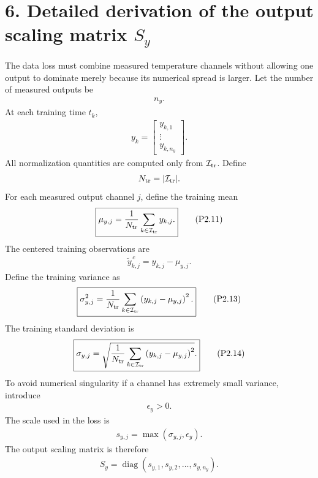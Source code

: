 \documentclass[11pt]{article}
\begin{document}
\section*{6. Detailed derivation of the output scaling matrix \(S_y\)}
The data loss must combine measured temperature channels without allowing one output to dominate merely because its numerical spread is larger. Let the number of measured outputs be
\begin{align}
n_y.
\end{align}
At each training time \(t_k\),
\begin{align}
y_k=\begin{bmatrix}y_{k,1}\\ \vdots\\ y_{k,n_y}\end{bmatrix}.
\end{align}
All normalization quantities are computed only from \(\mathcal I_{\rm tr}\). Define
\begin{align}
N_{\rm tr}=|\mathcal I_{\rm tr}|.
\end{align}
For each measured output channel \(j\), define the training mean
\begin{align}
\boxed{\mu_{y,j}=\frac{1}{N_{\rm tr}}\sum_{k\in\mathcal I_{\rm tr}}y_{k,j}.}
\tag{P2.11}
\end{align}
The centered training observations are
\begin{align}
\widetilde y^{\,c}_{k,j}=y_{k,j}-\mu_{y,j}.
\tag{P2.12}
\end{align}
Define the training variance as
\begin{align}
\boxed{\sigma_{y,j}^2=\frac{1}{N_{\rm tr}}\sum_{k\in\mathcal I_{\rm tr}}\left(y_{k,j}-\mu_{y,j}\right)^2.}
\tag{P2.13}
\end{align}
The training standard deviation is
\begin{align}
\boxed{\sigma_{y,j}=\sqrt{\frac{1}{N_{\rm tr}}\sum_{k\in\mathcal I_{\rm tr}}\left(y_{k,j}-\mu_{y,j}\right)^2}.}
\tag{P2.14}
\end{align}
To avoid numerical singularity if a channel has extremely small variance, introduce
\begin{align}
\epsilon_y>0.
\end{align}
The scale used in the loss is
\begin{align}
\boxed{s_{y,j}=\max\left(\sigma_{y,j},\epsilon_y\right).}
\tag{P2.15}
\end{align}
The output scaling matrix is therefore
\begin{align}
\boxed{S_y=\operatorname{diag}\left(s_{y,1},s_{y,2},\ldots,s_{y,n_y}\right).}
\tag{P2.16}
\end{align}
\end{document}
